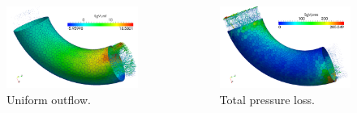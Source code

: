 \documentclass[8pt]{beamer}
\begin{document}
{\begin{columns}[c]
\column[c]{5cm}
\begin{figure}[htbp]
    \includegraphics[scale=0.11]{TorusAdjUnif150.png}
  \caption{Uniform outflow.}
\end{figure}
\column{5cm}
\begin{figure}[htbp]
    \includegraphics[scale=0.11]{TorusAdjPress150.png}
  \caption{Total pressure loss.}
\end{figure}
\end{columns}
$ $\\
$ $\\
$ $\\
$ $\\
}
%
%
\end{document}
